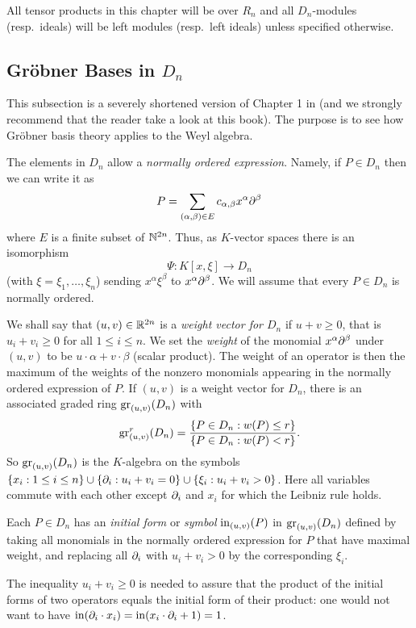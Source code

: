 All tensor products in this chapter will be over $R_n$ and all
$D_n$-modules (resp.\ ideals)
 will be left modules (resp.\ left ideals) unless specified otherwise.
%
\subsection{Gr\"obner Bases in $D_n$}
This subsection is a severely shortened version of Chapter 1 in
\cite{DM:SST} (and we strongly recommend that the reader take a look at
this book). The 
purpose is to see how Gr\"obner basis theory applies to the Weyl algebra.

The elements in $D_n$ allow a {\em normally ordered
expression}. 
Namely, if $P\in D_n$ then we can write it as 
\[
P=\sum_{(\alpha,\beta)\in E}c_{\alpha,\beta}x^\alpha\partial^\beta
\]
where $E$ is a finite subset of ${\mathbb N}^{2n}$.
Thus, as $K$-vector spaces there is an isomorphism
\[
\Psi:K[x,\xi]\to D_n
\]
(with $\xi=\xi_1,\ldots,\xi_n$) 
sending $x^\alpha\xi^\beta$ to $x^\alpha\partial^\beta$. We will assume
that every $P\in D_n$ is normally ordered.

We shall say that $(u,v)\in{\mathbb R}^{2n}$ is a {\em weight vector for
$D_n$}
if $u+v\geq 0$, that is $u_i+v_i\geq 0$ for all $1\le i\le n$. We
set the {\em weight}
 of the monomial $x^\alpha\partial^\beta$ under
$(u,v)$ to be $u\cdot\alpha+v\cdot\beta$ (scalar product). The weight
of an operator is then the maximum of the weights of the nonzero
monomials appearing in the normally ordered expression of $P$.
 If $(u,v)$
is a weight vector for $D_n$, there is an associated graded ring
$\operatorname{gr}_{(u,v)}(D_n)$ with 
\[
\operatorname{gr}_{(u,v)}^r(D_n)=\frac{\{P\in D_n : w(P)\le r\}}{\{P\in D_n : w(P)<
r\}}.
\]
So $\operatorname{gr}_{(u,v)}(D_n)$ is 
the
$K$-algebra on the symbols $\{x_i:1\le i\le n\}\cup
\{\partial_i:u_i+v_i=0\}\cup\{\xi_i:u_i+v_i>0\}$. Here all variables
commute with each other except $\partial_i$ and $x_i$ for which the
Leibniz rule holds.

Each $P\in D_n$ has an {\em initial form}
 or {\em symbol}  $\operatorname{in}_{(u,v)}(P)$ 
in $\operatorname{gr}_{(u,v)}(D_n)$ defined by
taking all monomials in the normally ordered expression for $P$ that
have maximal weight, and replacing all $\partial_i$ with $u_i+v_i>0$ by
the corresponding $\xi_i$. 

The inequality $u_i+v_i\geq
0$ is 
needed to assure that the product of the initial forms of two
operators equals the initial form of their product: one would not want
to have $\operatorname{in}(\partial_i\cdot x_i)=\operatorname{in}(x_i\cdot\partial_i +1)=1$.



